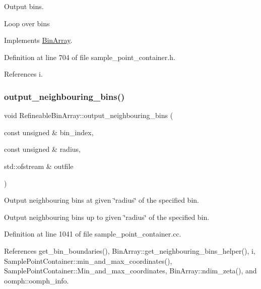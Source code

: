 Output bins. 

Loop over bins 

Implements \hyperlink{classBinArray_a66fe7e379a53e3fee81ead7ef4045b40}{Bin\+Array}.



Definition at line 704 of file sample\+\_\+point\+\_\+container.\+h.



References i.

\mbox{\label{classRefineableBinArray_a98b6de46ffffbdc8045831c6fc03b159}} 
\subsubsection{\texorpdfstring{output\+\_\+neighbouring\+\_\+bins()}{output\_neighbouring\_bins()}}
{\footnotesize\ttfamily void Refineable\+Bin\+Array\+::output\+\_\+neighbouring\+\_\+bins (\begin{DoxyParamCaption}\item[{const unsigned \&}]{bin\+\_\+index,  }\item[{const unsigned \&}]{radius,  }\item[{std\+::ofstream \&}]{outfile }\end{DoxyParamCaption})}



Output neighbouring bins at given \char`\"{}radius\char`\"{} of the specified bin. 

Output neighbouring bins up to given \char`\"{}radius\char`\"{} of the specified bin. 

Definition at line 1041 of file sample\+\_\+point\+\_\+container.\+cc.



References get\+\_\+bin\+\_\+boundaries(), Bin\+Array\+::get\+\_\+neighbouring\+\_\+bins\+\_\+helper(), i, Sample\+Point\+Container\+::min\+\_\+and\+\_\+max\+\_\+coordinates(), Sample\+Point\+Container\+::\+Min\+\_\+and\+\_\+max\+\_\+coordinates, Bin\+Array\+::ndim\+\_\+zeta(), and oomph\+::oomph\+\_\+info.

\mbox{\label{classRefineableBinArray_a827b6f05fefe24b6099044159c01ea34}} 
